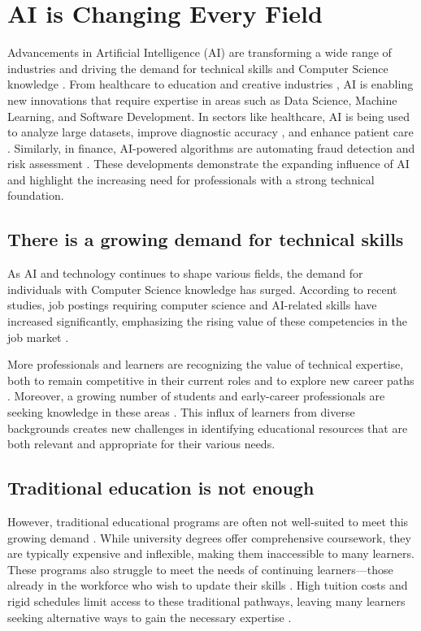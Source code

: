 \section{AI is Changing Every Field} 

Advancements in Artificial Intelligence (AI) are transforming a wide range of industries \cite{nature:2023} and driving the demand for technical skills and Computer Science knowledge \cite{tamayo:2023}. From healthcare \cite{saxena:2024} to education \cite{luckin:2016} and creative industries \cite{almamari:2024}, AI is enabling new innovations that require expertise in areas such as Data Science, Machine Learning, and Software Development. In sectors like healthcare, AI is being used to analyze large datasets, improve diagnostic accuracy \cite{lenharo:2023}, and enhance patient care \cite{ranjbar:2024}. Similarly, in finance, AI-powered algorithms are automating fraud detection and risk assessment \cite{shabir:2024}. These developments demonstrate the expanding influence of AI and highlight the increasing need for professionals with a strong technical foundation.

\subsection{There is a growing demand for technical skills}

As AI and technology continues to shape various fields, the demand for individuals with Computer Science knowledge has surged. According to recent studies, job postings requiring computer science and AI-related skills have increased significantly, emphasizing the rising value of these competencies in the job market \cite{bls:2024} \cite{wef:2020}. 

More professionals and learners are recognizing the value of technical expertise, both to remain competitive in their current roles and to explore new career paths \cite{abe:2020}. Moreover, a growing number of students and early-career professionals are seeking knowledge in these areas \cite{anderson:2023}. This influx of learners from diverse backgrounds creates new challenges in identifying educational resources that are both relevant and appropriate for their various needs.

\subsection{Traditional education is not enough }
However, traditional educational programs are often not well-suited to meet this growing demand \cite{shell:2018}. While university degrees offer comprehensive coursework, they are typically expensive and inflexible, making them inaccessible to many learners. These programs also struggle to meet the needs of continuing learners—those already in the workforce who wish to update their skills \cite{laal:2012}. High tuition costs and rigid schedules limit access to these traditional pathways, leaving many learners seeking alternative ways to gain the necessary expertise \cite{vargas:2023}.

